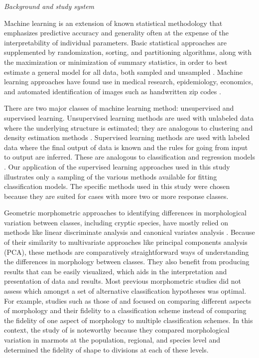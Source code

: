\documentclass[12pt,letterpaper]{article}
\renewcommand{\subsection}[1]{%
\bigskip
\begin{center}
\begin{large}
\normalfont\itshape #1
\end{large}
\end{center}}
\begin{document}
\subsection{Background and study system}
Machine learning is an extension of known statistical methodology \citep{Hastie2009} that emphasizes predictive accuracy and generality often at the expense of the interpretability of individual parameters. Basic statistical approaches are supplemented by randomization, sorting, and partitioning algorithms, along with the maximization or minimization of summary statistics, in order to best estimate a general model for all data, both sampled and unsampled \citep{Hastie2009}. Machine learning approaches have found use in medical research, epidemiology, economics, and automated identification of images such as handwritten zip codes \citep{Hastie2009}. %

There are two major classes of machine learning method: unsupervised and supervised learning. Unsupervised learning methods are used with unlabeled data where the underlying structure is estimated; they are analogous to clustering and density estimation methods \citep{Kaufman1990}. Supervised learning methods are used with labeled data where the final output of data is known and the rules for going from input to output are inferred. These are analogous to classification and regression models \citep{Breiman1984,Hastie2009}. Our application of the supervised learning approaches used in this study illustrates only a sampling of the various methods available for fitting classification models. The specific methods used in this study were chosen because they are suited for cases with more two or more response classes.

Geometric morphometric approaches to identifying differences in morphological variation between classes, including cryptic species, have mostly relied on methods like linear discriminate analysis and canonical variates analysis \citep{Polly2003,Zelditch2004,Gaubert2005b,Gunduz2007,Polly2007a,Francoy2009,Sztencel-Jabonka2009,MitrovskiBogdanovic2013,Dillard2017}. Because of their similarity to multivariate approaches like principal components analysis (PCA), these methods are comparatively straightforward ways of understanding the differences in morphology between classes. They also benefit from producing results that can be easily visualized, which aids in the interpretation and presentation of data and results. Most previous morphometric studies did not assess which amongst a set of alternative classification hypotheses was optimal. For example, studies such as those of \citet{Caumul2005a} and \citet{Polly2007a} focused on comparing different aspects of morphology and their fidelity to a classification scheme instead of comparing the fidelity of one aspect of morphology to multiple classification schemes. In this context, the study of \citet{Cardini2009a} is noteworthy because they compared morphological variation in marmots at the population, regional, and species level and determined the fidelity of shape to divisions at each of these levels.
\end{document}
